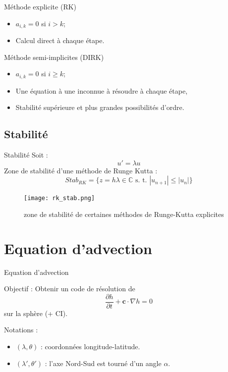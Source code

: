 \documentclass[11pt]{beamer}
\begin{document}
\begin{frame}
\begin{block}{Méthode explicite (RK)}
\begin{itemize}
\item $a_{i,k} = 0$ si $i > k$;
\item Calcul direct à chaque étape.
\end{itemize}
\end{block}

\begin{block}{Méthode semi-implicites (DIRK)}
\begin{itemize}
\item $a_{i,k} = 0$ si $i \geq k$;
\item Une équation à une inconnue à résoudre à chaque étape,
\item Stabilité supérieure et plus grandes possibilités d'ordre.
\end{itemize}
\end{block}

\end{frame}

\subsection{Stabilité}
\begin{frame}{Stabilité}
Soit :
$$u' = \lambda u$$
Zone de stabilité d'une méthode de Runge Kutta :
$$Stab_{RK} = \lbrace z = h \lambda \in \mathbb{C} \text{ s. t. }
| u_{n+1} | \leq | u_n | \rbrace $$

\begin{figure}
\begin{center}
\texttt{[image: rk\_stab.png]}
\caption{zone de stabilité de certaines méthodes de Runge-Kutta explicites}
\end{center}
\end{figure}

\end{frame}



\section{Equation d'advection}
\begin{frame}{Equation d'advection}
\begin{block}{Objectif :}
Obtenir un code de résolution de 
$$\dfrac{\partial h}{\partial t} + \mathbf{c} \cdot \nabla h = 0$$
sur la sphère (+ CI).
\end{block}

Notations : 
\begin{itemize}
\item $(\lambda, \theta)$ : coordonnées longitude-latitude.
\item $(\lambda', \theta')$ : l'axe Nord-Sud est tourné d'un angle $\alpha$.
\end{itemize}
\end{frame}
\end{document}
